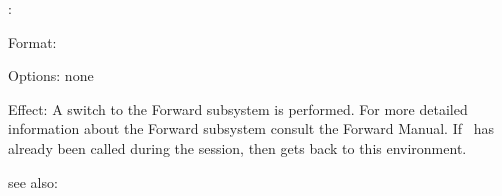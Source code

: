 \colab{} \forward:

Format: 

Options: none

Effect: A switch to the Forward subsystem is performed. For more 
        detailed information about the Forward subsystem consult the 
        Forward Manual. 
	If \forward \ has already been called during the \COLAB{} 
        session, then \COLAB{} gets back to this environment.
       
see also: \colab
